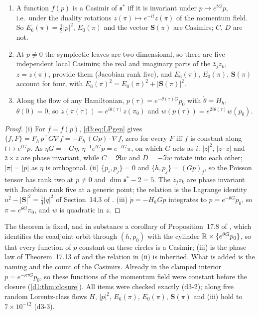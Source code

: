 \begin{theorem}
\label{d3:thm:frozen}
\begin{enumerate}[label=(\roman*),leftmargin=2.2em]
\item A function $f(p)$ is a Casimir of $\mathfrak s^*$ iff it is invariant under $p\mapsto e^{tG}p$, i.e.\ under the duality rotations
$z(\pi)\mapsto e^{-it}z(\pi)$ of the momentum field. So $E_6(\pi)=\tfrac12|p|^2$, $E_0(\pi)$ and the vector $\mathbf S(\pi)$ are Casimirs; $C$, $D$ are not.
\item At $p\neq0$ the symplectic leaves are two-dimensional, so there are five independent local Casimirs; the real and imaginary parts of the
$\bar z_jz_k$, $z=z(\pi)$, provide them (Jacobian rank five), and $E_6(\pi)$, $E_0(\pi)$, $\mathbf S(\pi)$ account for four, with
$E_6(\pi)^2=E_0(\pi)^2+|\mathbf S(\pi)|^2$.
\item Along the flow of any Hamiltonian, $p(\tau)=e^{-\theta(\tau)G}p_0$ with $\dot\theta=H_h$, $\theta(0)=0$, so
$z(\pi(\tau))=e^{i\theta(\tau)}z(\pi_0)$ and $w(p(\tau))=e^{2i\theta(\tau)}w(p_0)$.
\end{enumerate}
\end{theorem}

\begin{proof}
(i) For $f=f(p)$, \eqref{d3:eq:LPgen} gives $\{f,F\}=F_h\,p^{\!\top}G\nabla f=-F_h\,(Gp)\cdot\nabla f$, zero for every $F$ iff $f$ is constant along
$t\mapsto e^{tG}p$. As $\eta G=-G\eta$, $\eta^{-1}e^{tG}p=e^{-tG}\pi$, on which $G$ acts as $i$. $|z|^2$, $|z\cdot z|$ and $\bar z\times z$ are phase
invariant, while $C=\Re w$ and $D=-\Im w$ rotate into each other; $|\pi|=|p|$ as $\eta$ is orthogonal. (ii) $\{p_i,p_j\}=0$ and $\{h,p_j\}=(Gp)_j$, so
the Poisson tensor has rank two at $p\neq0$ and $\dim\mathfrak s^*-2=5$. The $\bar z_jz_k$ are phase invariant with Jacobian rank five at a generic
point; the relation is the Lagrange identity $u^2-|\mathbf S|^2=\tfrac14|q|^2$ of Section~14.3 of \cite{ES17}. (iii) $\dot p=-H_hGp$ integrates to
$p=e^{-\theta G}p_0$, so $\pi=e^{\theta G}\pi_0$, and $w$ is quadratic in $z$.
\end{proof}

The theorem is fixed, and in substance a corollary of Proposition~17.8 of \cite{ES17}, which identifies the coadjoint orbit through $(h,p_0)$ with
the cylinder $\mathbb{R}\times\{e^{\theta G}p_0\}$, so that every function of $p$ constant on these circles is a Casimir; (iii) is the phase law of
Theorem~17.13 of \cite{ES17} and the relation in (ii) is inherited. What is added is the naming and the count of the Casimirs. Already in the
clamped interior $p=e^{-\kappa\tau G}p_0$, so these functions of the momentum field were constant before the closure (\cref{d1:thm:closure}). All
items were checked exactly (d3-2); along five random Lorentz-class flows $H$, $|p|^2$, $E_6(\pi)$, $E_0(\pi)$, $\mathbf S(\pi)$ and (iii) hold to
$7\times10^{-12}$ (d3-3).

